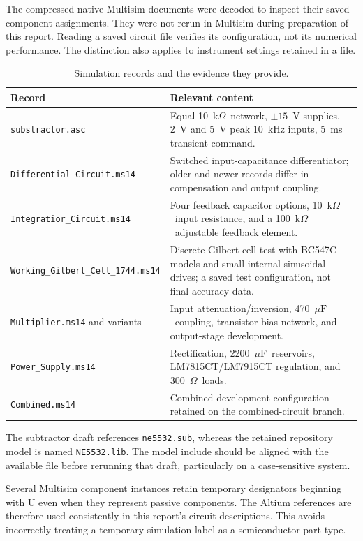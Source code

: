 \documentclass[11pt,a4paper]{article}
\newcommand{\ohm}{\ensuremath{\Omega}}
\newcommand{\kohm}{\ensuremath{\mathrm{k}\Omega}}
\newcommand{\uF}{\ensuremath{\mu\mathrm{F}}}
\begin{document}
The compressed native Multisim documents were decoded to inspect their saved component assignments. They were not rerun in Multisim during preparation of this report. Reading a saved circuit file verifies its configuration, not its numerical performance. The distinction also applies to instrument settings retained in a file.

\begin{table}[htbp]
\centering\small
\caption{Simulation records and the evidence they provide.}
\begin{tabularx}{\textwidth}{P{0.33\textwidth}Y}
\toprule
\textbf{Record} & \textbf{Relevant content}\\
\midrule
\texttt{substractor.asc} & Equal 10~\kohm\ network, $\pm15$~V supplies, 2~V and 5~V peak 10~kHz inputs, 5~ms transient command.\\
\texttt{Differential\_\allowbreak{}Circuit.ms14} & Switched input-capacitance differentiator; older and newer records differ in compensation and output coupling.\\
\texttt{Integratior\_\allowbreak{}Circuit.ms14} & Four feedback capacitor options, 10~\kohm\ input resistance, and a 100~\kohm\ adjustable feedback element.\\
\texttt{Working\_\allowbreak{}Gilbert\_\allowbreak{}Cell\_\allowbreak{}1744.ms14} & Discrete Gilbert-cell test with BC547C models and small internal sinusoidal drives; a saved test configuration, not final accuracy data.\\
\texttt{Multiplier.ms14} and variants & Input attenuation/inversion, 470~\uF\ coupling, transistor bias network, and output-stage development.\\
\texttt{Power\_\allowbreak{}Supply.ms14} & Rectification, 2200~\uF\ reservoirs, LM7815CT/LM7915CT regulation, and 300~\ohm\ loads.\\
\texttt{Combined.ms14} & Combined development configuration retained on the combined-circuit branch.\\
\bottomrule
\end{tabularx}
\end{table}

The subtractor draft references \texttt{ne5532.sub}, whereas the retained repository model is named \texttt{NE5532.lib}. The model include should be aligned with the available file before rerunning that draft, particularly on a case-sensitive system.

Several Multisim component instances retain temporary designators beginning with U even when they represent passive components. The Altium references are therefore used consistently in this report's circuit descriptions. This avoids incorrectly treating a temporary simulation label as a semiconductor part type.
\end{document}
